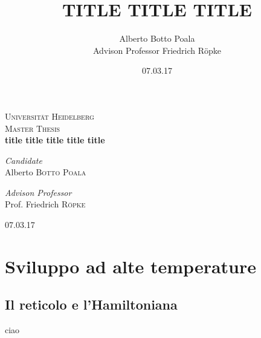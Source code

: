 \documentclass[11pt]{article}
\title{TITLE TITLE TITLE}
\author{Alberto Botto Poala\\
Advison Professor Friedrich Röpke}
\date{07.03.17}
\begin{document}
\begin{titlepage}
\begin{center}



\textsc{\LARGE Universität Heidelberg}\\[1.8cm]

\textsc{\Large Master Thesis}\\[0.5cm]


{ \huge \bfseries title title title title title \\[0.5cm] }



\begin{minipage}{0.4\textwidth}
\begin{flushleft} \large
\emph{Candidate}\\
Alberto \textsc{Botto Poala}
\end{flushleft}
\end{minipage}
\begin{minipage}{0.4\textwidth}
\begin{flushright} \large
\emph{Advison Professor} \\
Prof. Friedrich \textsc{Röpke}
\end{flushright}
\end{minipage}

\vfill

{07.03.17}

\end{center}
\end{titlepage}


\maketitle
\section{Sviluppo ad alte temperature}
\subsection{Il reticolo e l'Hamiltoniana}

ciao
\end{document}
